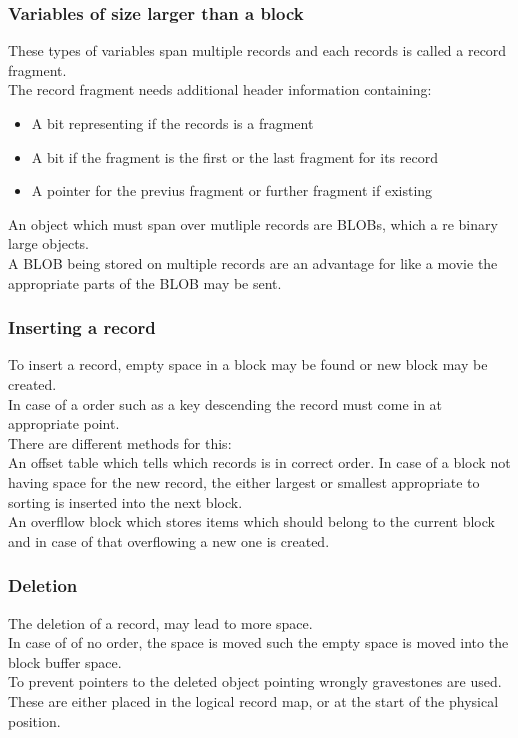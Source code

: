 \documentclass[12pt, a4paper]{article}
\begin{document}
			\subsubsection{Variables of size larger than a block}
				These types of variables span multiple records and each records is called a record fragment.\\
				The record fragment needs additional header information containing:
				\begin{itemize}
					\item A bit representing if the records is a fragment
					\item A bit if the fragment is the first or the last fragment for its record
					\item A pointer for the previus fragment or further fragment if existing
				\end{itemize}
				An object which must span over mutliple records are BLOBs, which a re binary large objects.\\
				A BLOB being stored on multiple records are an advantage for like a movie the appropriate parts of the BLOB may be sent.
			\subsubsection{Inserting a record}
				To insert a record, empty space in a block may be found or new block may be created.\\
				In case of a order such as a key descending the record must come in at appropriate point.\\
				There are different methods for this:\\
				An offset table which tells which records is in correct order. In case of a block not having space for the new record, the either largest or smallest appropriate to sorting is inserted into the next block.\\
				An overfllow block which stores items which should belong to the current block and in case of that overflowing a new one is created.
			\subsubsection{Deletion}
				The deletion of a record, may lead to more space.\\
				In case of of no order, the space is moved such the empty space is moved into the block buffer space.\\
				To prevent pointers to the deleted object pointing wrongly gravestones are used.\\
				These are either placed in the logical record map, or at the start of the physical position.
\end{document}
